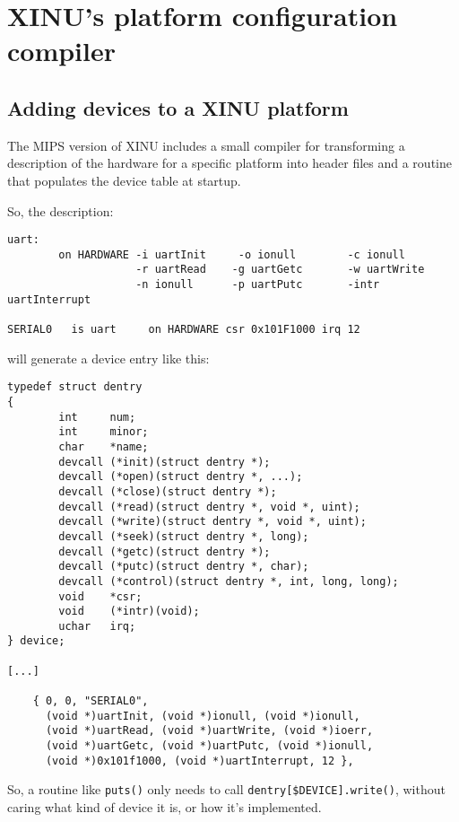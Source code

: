 \documentclass[12pt]{article}
\newcommand{\code}[1]{{\tt #1}}
\begin{document}
\pagebreak

\section{XINU's platform configuration compiler}

\subsection{Adding devices to a XINU platform}

The MIPS version of XINU includes a small compiler for transforming a
description of the hardware for a specific platform into header files and a
routine that populates the device table at startup.

So, the description:

\begin{verbatim}
uart:
        on HARDWARE -i uartInit     -o ionull        -c ionull
                    -r uartRead    -g uartGetc       -w uartWrite 
                    -n ionull      -p uartPutc       -intr uartInterrupt

SERIAL0   is uart     on HARDWARE csr 0x101F1000 irq 12
\end{verbatim}

will generate a device entry like this:

\begin{verbatim}
typedef struct dentry
{
        int     num;
        int     minor;
        char    *name;
        devcall (*init)(struct dentry *);
        devcall (*open)(struct dentry *, ...);
        devcall (*close)(struct dentry *);
        devcall (*read)(struct dentry *, void *, uint);
        devcall (*write)(struct dentry *, void *, uint);
        devcall (*seek)(struct dentry *, long);
        devcall (*getc)(struct dentry *);
        devcall (*putc)(struct dentry *, char);
        devcall (*control)(struct dentry *, int, long, long);
        void    *csr;
        void    (*intr)(void);
        uchar   irq;
} device;

[...]

	{ 0, 0, "SERIAL0",
	  (void *)uartInit, (void *)ionull, (void *)ionull,
	  (void *)uartRead, (void *)uartWrite, (void *)ioerr,
	  (void *)uartGetc, (void *)uartPutc, (void *)ionull,
	  (void *)0x101f1000, (void *)uartInterrupt, 12 },
\end{verbatim}

So, a routine like \code{puts()} only needs to call
\code{dentry[\$DEVICE].write()}, without caring what kind of device it is, or
how it's implemented.
\end{document}
